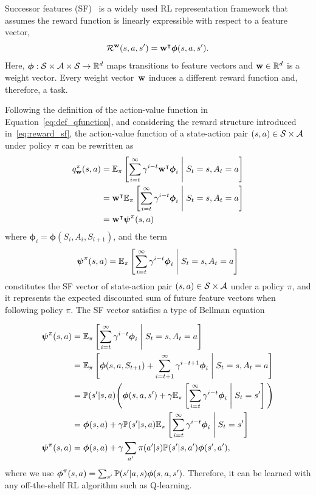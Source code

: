 Successor features (SF)~\citep{Barreto2017} is a widely used RL representation framework that assumes the reward function is linearly expressible with respect to a feature vector,
\begin{equation}
  \mathcal{R}^{\mathbf{w}}(s, a, s') = \mathbf{w}^\intercal\boldsymbol{\phi}(s, a , s').
  \label{eq:reward_sf}
\end{equation}
Here, $\boldsymbol\phi:\mathcal{S}\times\mathcal{A}\times\mathcal{S}\rightarrow\mathbb{R}^{d}$ maps transitions to feature vectors and $\mathbf{w}\in\mathbb{R}^d$ is a weight vector. Every weight vector~$\mathbf{w}$ induces a different reward function and, therefore, a task. 

Following the definition of the action-value function in Equation~\eqref{eq:def_qfunction}, and considering the reward structure introduced in~\eqref{eq:reward_sf}, the action-value function of a state-action pair $(s, a)\in\mathcal{S}\times\mathcal{A}$ under policy $\pi$ can be rewritten as
\begin{align}
  q^\pi_{\mathbf{w}}(s, a) &= \mathbb{E}_{\pi}\left[\sum_{i=t} ^\infty \gamma^{i-t} \mathbf{w}^\intercal\boldsymbol\phi_i\;\middle\lvert\;S_t = s, A_t = a\right] \nonumber \\
                 & = \mathbf{w}^\intercal\mathbb{E}_{\pi}\left[\sum_{i=t} ^\infty \gamma^{i-t} \boldsymbol\phi_i\;\middle\lvert\;S_t = s, A_t = a\right] \nonumber \\
                 &=  \mathbf{w}^\intercal \boldsymbol{\mathbf{\psi}}^\pi(s, a)
\label{eq:qfunction_sf}
\end{align}
where $\boldsymbol\phi_i = \boldsymbol\phi(S_{i}, A_{i}, S_{i+1})$, and the term
\begin{equation}
  \boldsymbol{\mathbf{\psi}}^\pi(s, a) = \mathbb{E}_{\pi}\left[\sum_{i=t}^\infty \gamma^{i-t} \boldsymbol\phi_i\;\middle\lvert\;S_t = s, A_t = a\right]
  \label{eq:sf}
\end{equation}
constitutes the SF vector of state-action pair $(s,a)\in\mathcal{S}\times\mathcal{A}$ under a policy $\pi$, and it represents the expected discounted sum of future feature vectors when following policy $\pi$. The SF vector satisfies a type of Bellman equation 

\begingroup
\addtolength{\jot}{1em}
\begin{align*}
  \boldsymbol{\mathbf{\psi}}^\pi(s, a) &= \mathbb{E}_{\pi}\left[\sum_{i=t} ^\infty \gamma^{i-t} \boldsymbol\phi_i\;\middle\lvert\;S_t = s, A_t = a\right] \\
                     &= \mathbb{E}_{\pi}\left[\boldsymbol\phi(s, a, S_{t+1}) + \sum_{i=t+1} ^\infty \gamma^{i-t+1} \boldsymbol\phi_i\;\middle\lvert\;S_t = s, A_t = a\right] \\
                     &= \mathbb{P}(s'\lvert s, a)\Bigg(\boldsymbol\phi(s, a, s') + \gamma \mathbb{E}_{\pi}\left[\sum_{i=t} ^\infty \gamma^{i-t} \boldsymbol\phi_i\;\middle\lvert\;S_t = s'\right]\Bigg) \\
                     &= \boldsymbol\phi(s, a) + \gamma \mathbb{P}(s'\lvert s, a) \mathbb{E}_{\pi}\left[\sum_{i=t} ^\infty \gamma^{i-t} \boldsymbol\phi_i\;\middle\lvert\;S_t = s'\right] \\
  \boldsymbol{\mathbf{\psi}}^\pi(s, a) &= \boldsymbol\phi(s, a) + \gamma \sum_{a'}\pi(a'\lvert s) \mathbb{P}(s'\lvert s, a') \boldsymbol\phi(s', a'),
\end{align*}
\endgroup
where we use $\boldsymbol\phi^\pi(s, a) = \sum_{s'}\mathbb{P}(s'\lvert a, s)\boldsymbol{\phi}(s, a, s')$. Therefore, it can be learned with any off-the-shelf RL algorithm such as Q-learning.

